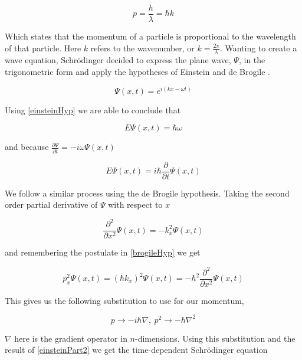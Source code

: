 \documentclass[authoryearcitations]{UoYCSproject}
\begin{document}
\begin{equation}
p = \frac{h}{\lambda} = \hbar k 
\label{brogileHyp}
\end{equation}

Which states that the momentum of a particle is proportional to the wavelength of that particle. Here $k$ refers to the 
wavenumber, or $k = \frac{2\pi}{\lambda}$. Wanting to create a wave equation, Schr\"{o}dinger decided to express the plane
wave, $\Psi$, in the trigonometric form and apply the hypotheses of Einstein and de Brogile \cite{ricardo}. 

\begin{equation}
\Psi (x, t) = e^{i(k\dot x-\omega t)}
\end{equation}

Using \ref{einsteinHyp} we are able to conclude that

\begin{equation}
E\Psi (x,t) = \hbar\omega
\label{einsteinPart}
\end{equation}

and because $\frac{\partial\Psi}{\partial t} = -i\omega\Psi (x,t)$

\begin{equation}
E\Psi (x,t) = i\hbar\frac{\partial}{\partial t}\Psi (x,t)
\label{einsteinPart2}
\end{equation}

We follow a similar process using the de Brogile hypothesis. Taking the second order partial derivative of
$\Psi$ with respect to $x$ 

$$\frac{\partial ^2}{\partial x^2}\Psi (x,t) = -k_{x}^{2}\Psi(x,t) $$

and remembering the postulate in \ref{brogileHyp} we get

\begin{equation}
p_{x}^{2}\Psi (x,t) = (\hbar k_{x})^2\Psi (x,t) = -\hbar ^2\frac{\partial ^2}{\partial x^2}\Psi (x,t)
\label{brogile2}
\end{equation}

This gives us the following substitution to use for our momentum,

\begin{equation}
p \rightarrow -i\hbar \nabla,\ p^2 \rightarrow -\hbar\nabla ^2
\label{eq:momentumSub}
\end{equation}

$\nabla$ here is the gradient operator in $n$-dimensions. Using this substitution and the result of 
\ref{einsteinPart2} we get the time-dependent Schr\"{o}dinger equation 
\end{document}
